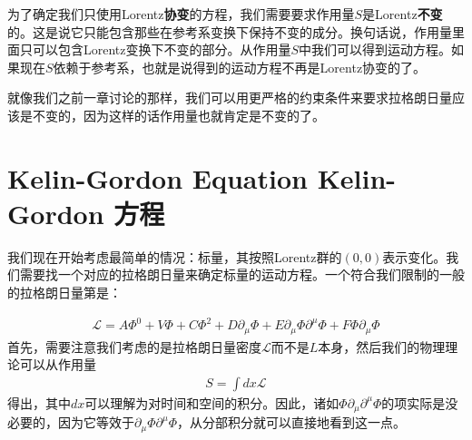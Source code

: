 为了确定我们只使用Lorentz{\bf 协变}的方程，我们需要要求作用量$S$是Lorentz{\bf 不变}的。这是说它只能包含那些在参考系变换下保持不变的成分。换句话说，作用量里面只可以包含Lorentz变换下不变的部分。从作用量$S$中我们可以得到运动方程。如果现在$S$依赖于参考系，也就是说得到的运动方程不再是Lorentz协变的了。

就像我们之前一章讨论的那样，我们可以用更严格的约束条件来要求拉格朗日量应该是不变的，因为这样的话作用量也就肯定是不变的了。

\section[Kelin-Gordon 方程]{Kelin-Gordon Equation Kelin-Gordon 方程}\label{sec6.2}

我们现在开始考虑最简单的情况：标量，其按照Lorentz群的$(0,0)$表示变化。我们需要找一个对应的拉格朗日量来确定标量的运动方程。一个符合我们限制的一般的拉格朗日量第是：

\begin{align}
\mathcal{L} = A\Phi^0+V\Phi+C\Phi^2+D\partial_\mu\Phi+E\partial_\mu\Phi\partial^\mu\Phi+F\Phi\partial_\mu\Phi
\end{align}
首先，需要注意我们考虑的是拉格朗日量密度$\mathcal{L}$而不是$L$本身，然后我们的物理理论可以从作用量
\begin{align}
S = \int dx\mathcal{L}
\end{align}
得出，其中$dx$可以理解为对时间和空间的积分。因此，诸如$\Phi\partial_\mu\partial^\mu\Phi$的项实际是没必要的，因为它等效于$\partial_\mu\Phi\partial^\mu\Phi$，从分部积分就可以直接地看到这一点。

